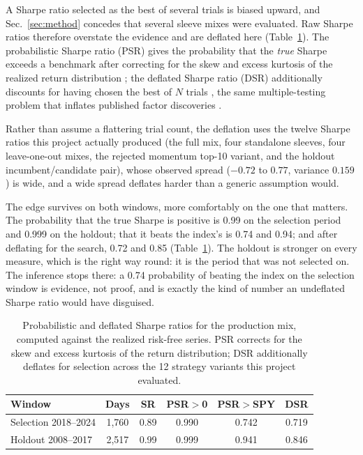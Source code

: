 \documentclass[10pt,twocolumn]{IEEEtran}
\begin{document}
A Sharpe ratio selected as the best of several trials is biased upward, and
Sec.~\ref{sec:method} concedes that several sleeve mixes were evaluated. Raw
Sharpe ratios therefore overstate the evidence and are deflated here
(Table~\ref{tab:dsr}). The probabilistic Sharpe ratio (PSR) gives the
probability that the \emph{true} Sharpe exceeds a benchmark after correcting
for the skew and excess kurtosis of the realized return distribution
\cite{bailey2012psr}; the deflated Sharpe ratio (DSR) additionally discounts
for having chosen the best of $N$ trials \cite{bailey2014deflated}, the same
multiple-testing problem that inflates published factor discoveries
\cite{harvey2016cross}.

Rather than assume a flattering trial count, the deflation uses the twelve
Sharpe ratios this project actually produced (the full mix, four standalone
sleeves, four leave-one-out mixes, the rejected momentum top-10 variant, and
the holdout incumbent/candidate pair), whose observed spread ($-0.72$ to
$0.77$, variance $0.159$) is wide, and a wide spread deflates harder than a
generic assumption would.

The edge survives on both windows, more comfortably on the one that matters.
The probability that the true Sharpe is positive is 0.99 on the selection
period and 0.999 on the holdout; that it beats the index's is 0.74 and 0.94;
and after deflating for the search, 0.72 and 0.85 (Table~\ref{tab:dsr}). The
holdout is stronger on every measure, which is the right way round: it is the
period that was not selected on. The inference stops there: a 0.74
probability of beating the index on the selection window is evidence, not
proof, and is exactly the kind of number an undeflated Sharpe ratio would have
disguised.

\begin{table}[t]
\caption{Probabilistic and deflated Sharpe ratios for the production mix,
computed against the realized risk-free series. PSR corrects for the skew and
excess kurtosis of the return distribution; DSR additionally deflates for
selection across the 12 strategy variants this project evaluated.}
\label{tab:dsr}
\centering
\begin{tabular}{lccccc}
\toprule
Window & Days & SR & PSR$>$0 & PSR$>$SPY & DSR \\
\midrule
Selection 2018--2024 & 1{,}760 & 0.89 & 0.990 & 0.742 & 0.719 \\
Holdout 2008--2017 & 2{,}517 & 0.99 & 0.999 & 0.941 & 0.846 \\
\bottomrule
\end{tabular}
\end{table}
\end{document}
